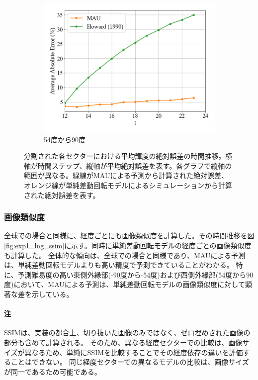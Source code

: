 \begin{figure}[htbp]
\begin{subfigure}{0.5\textwidth}
              \centering
              \includegraphics[width=\textwidth]{figures/exp1/lng_error_5.png}
              \caption{54度から90度}
              \label{fig:exp1_lng_error_5}
            \end{subfigure}
            \caption{分割された各セクターにおける平均輝度の絶対誤差の時間推移。横軸が時間ステップ、縦軸が平均絶対誤差を表す。各グラフで縦軸の範囲が異なる。緑線がMAUによる予測から計算された絶対誤差、オレンジ線が単純差動回転モデルによるシミュレーションから計算された絶対誤差を表す。}
            \label{fig:exp1_lng_error}
          \end{figure}
          
        \subsubsection{画像類似度}
          全球での場合と同様に、経度ごとにも画像類似度を計算した。その時間推移を図\ref{fig:exp1_lng_ssim}に示す。同時に単純差動回転モデルの経度ごとの画像類似度も計算した。
          全体的な傾向は、全球での場合と同様であり、MAUによる予測は、単純差動回転モデルよりも高い精度で予測できていることがわかる。
          特に、予測難易度の高い東側外縁部(-90度から-54度)および西側外縁部(54度から90度)において、MAUによる予測は、単純差動回転モデルの画像類似度に対して顕著な差を示している。
          \paragraph{注}
          SSIMは、実装の都合上、切り抜いた画像のみではなく、ゼロ埋めされた画像の部分も含めて計算される。
          そのため、異なる経度セクターでの比較は、画像サイズが異なるため、単純にSSIMを比較することでその経度依存の違いを評価することはできない。
          同じ経度セクターでの異なるモデルの比較は、画像サイズが同一であるため可能である。
          
